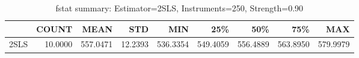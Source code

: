 \begin{table}[ht]
\centering
\caption{fstat summary: Estimator=2SLS, Instruments=250, Strength=0.90}
\begin{tabular}{lrrrrrrrr}
\toprule
 & COUNT & MEAN & STD & MIN & 25\% & 50\% & 75\% & MAX \\
\midrule
2SLS & 10.0000 & 557.0471 & 12.2393 & 536.3354 & 549.4059 & 556.4889 & 563.8950 & 579.9979 \\
\bottomrule
\end{tabular}
\end{table}
